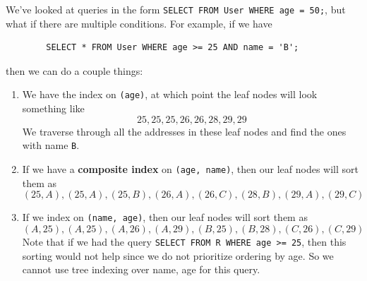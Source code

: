 \documentclass{article}
\begin{document}
    \begin{definition}
      We've looked at queries in the form \texttt{SELECT \* FROM User WHERE age = 50;}, but what if there are multiple conditions. For example, if we have 
      \begin{lstlisting}
        SELECT * FROM User WHERE age >= 25 AND name = 'B'; 
      \end{lstlisting}
      then we can do a couple things: 
      \begin{enumerate}
        \item We have the index on \texttt{(age)}, at which point the leaf nodes will look something like 
          \begin{equation}
            25, 25, 25, 26, 26, 28, 29, 29
          \end{equation}
          We traverse through all the addresses in these leaf nodes and find the ones with name \texttt{B}. 

        \item If we have a \textbf{composite index} on \texttt{(age, name)}, then our leaf nodes will sort them as 
          \begin{equation}
            (25, A), (25, A), (25, B), (26, A), (26, C), (28, B), (29, A), (29, C)
          \end{equation}

        \item If we index on \texttt{(name, age)}, then our leaf nodes will sort them as 
          \begin{equation}
            (A, 25), (A, 25), (A, 26), (A, 29), (B, 25), (B, 28), (C, 26), (C, 29)
          \end{equation}
          Note that if we had the query \texttt{SELECT \* FROM R WHERE age >= 25}, then this sorting would not help since we do not prioritize ordering by age. So we cannot use tree indexing over name, age for this query. 
      \end{enumerate}
    \end{definition}
\end{document}
